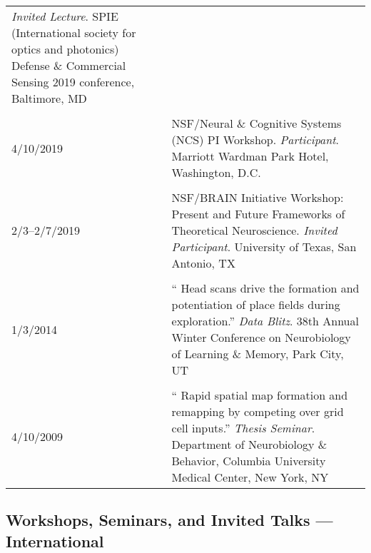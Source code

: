 \documentclass[10pt]{article}
\newcommand{\unpubtitle}[1]{{\color{hopkinsblue} #1}}
\begin{document}
\begin{longtable}{@{\hspace{0.2in}}l>{\raggedright\arraybackslash}p{}}
  \emph{Invited Lecture}. SPIE (International society for optics and photonics)
  Defense \& Commercial Sensing 2019 conference, Baltimore, MD\\
  \tabularnewline
  4/10/2019 & NSF/Neural \& Cognitive Systems (NCS) PI
  Workshop. \emph{Participant}. Marriott Wardman Park Hotel, Washington, D.C.\\
  \tabularnewline
  2/3--2/7/2019 & NSF/BRAIN Initiative Workshop: Present and Future Frameworks
  of Theoretical Neuroscience. \emph{Invited Participant}. University of Texas,
  San Antonio, TX\\
  \tabularnewline
  1/3/2014 & ``\unpubtitle{Head scans drive the formation and potentiation
  of place fields during exploration}.'' \emph{Data Blitz}. 38th Annual Winter
  Conference on Neurobiology of Learning \& Memory, Park City, UT\\
  \tabularnewline
  4/10/2009 & ``\unpubtitle{Rapid spatial map formation and remapping by
  competing over grid cell inputs}.'' \emph{Thesis Seminar}. Department of
  Neurobiology \& Behavior, Columbia University Medical Center, New York, NY\\
\end{longtable}

\subsection*{Workshops, Seminars, and Invited Talks --- International}
\label{sec:intltalks}
\end{document}
